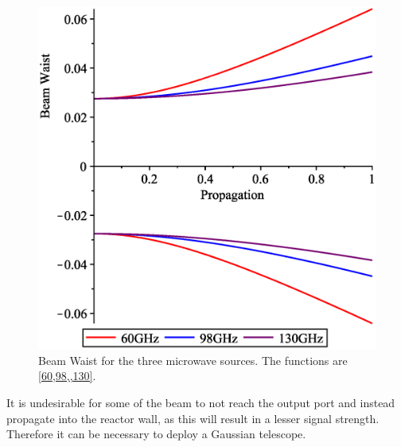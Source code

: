 \begin{figure}[H]
	\centering
	\includegraphics[width=.5\textwidth]{Figures/BeamProp.eps}
	\caption{Beam Waist for the three microwave sources. The functions are \cref{60,98,,130}.}
	\label{BeamProp}
\end{figure}
It is undesirable for some of the beam to not reach the output port and instead propagate into the reactor wall, as this will result in a lesser signal strength. Therefore it can be necessary to deploy a Gaussian telescope.
